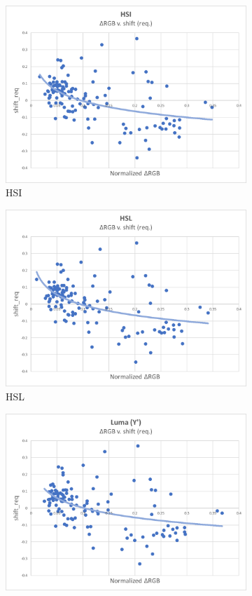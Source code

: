 \begin{figure}
\begin{subfigure}{.49\linewidth}
  \includegraphics[width=1\linewidth]{figures/model/scatter/model_hsi.jpg}
  \caption{HSI}
\end{subfigure}
\hfill
\begin{subfigure}{.49\linewidth}
  \includegraphics[width=1\linewidth]{figures/model/scatter/model_hsl.jpg}
  \caption{HSL}
\end{subfigure}
\hfill
\begin{subfigure}{.49\linewidth}
  \includegraphics[width=1\linewidth]{figures/model/scatter/model_luma.jpg}

\end{subfigure}
\end{figure}
